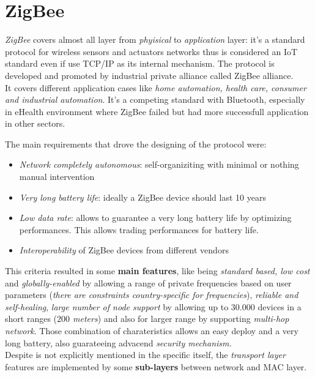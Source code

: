 \documentclass[10pt,a4paper]{report}
\theoremstyle{definition}
\begin{document}
\chapter{ZigBee}\label{sec:zigbee}
\textit{ZigBee} covers almost all layer from \textit{phyisical} to \textit{application} layer: it's a standard protocol for wireless sensors and actuators networks thus is considered an IoT standard even if use TCP/IP as its internal mechanism.
The protocol is developed and promoted by industrial private alliance called ZigBee alliance.\\
It covers different application cases like \textit{home automation, health care, consumer and industrial automation}. It's a competing standard with Bluetooth, especially in eHealth environment where ZigBee failed but had more successfull application in other sectors.

The main requirements that drove the designing of the protocol were:
\begin{itemize}
	\item 
	\textit{Network completely autonomous}: self-organiziting with minimal or nothing manual intervention
	\item 
	\textit{Very long battery life}: ideally a ZigBee device should last 10 years
	\item 
	\textit{Low data rate}: allows to guarantee a very long battery life by optimizing performances. This allows trading performances for battery life.
	\item 
	\textit{Interoperability} of ZigBee devices from different vendors
\end{itemize}

This criteria resulted in some \textbf{main features}, like being \textit{standard based, low cost} and \textit{globally-enabled} by allowing a range of private frequencies based on user parameters (\textit{there are constraints country-specific for frequencies}), \textit{reliable and self-healing}, \textit{large number of node support} by allowing up to $30.000$ devices in a short ranges (\textit{$200$ meters}) and also for larger range by supporting \textit{multi-hop network}. Those combination of charateristics allows an easy deploy and a very long battery, also guarateeing advacend \textit{security mechanism.}\\
Despite is not explicitly mentioned in the specific itself, the \textit{transport layer} features are implemented by some \textbf{sub-layers} between network and MAC layer.
\end{document}
